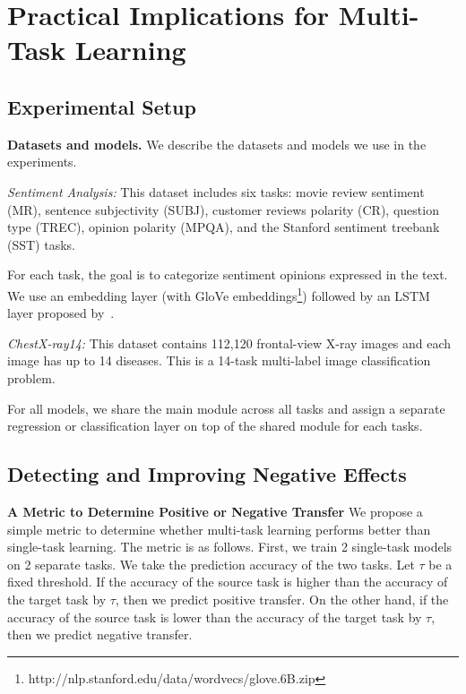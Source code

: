 \section{Practical Implications for Multi-Task Learning}

\subsection{Experimental Setup}

{\bf Datasets and models.} We describe the datasets and models we use in the experiments.

{\it Sentiment Analysis:} This dataset includes six tasks: movie review sentiment (MR), sentence subjectivity (SUBJ), customer reviews polarity (CR), question type (TREC), opinion polarity (MPQA), and the Stanford sentiment treebank (SST) tasks.

{For each task, the goal is to categorize sentiment opinions expressed in the text.
We use an embedding layer (with GloVe embeddings\footnote{http://nlp.stanford.edu/data/wordvecs/glove.6B.zip}) followed by an LSTM layer proposed by~\cite{lei2018simple}.
}

{\it ChestX-ray14:} This dataset contains 112,120 frontal-view X-ray images and each image has up to 14 diseases.
This is a 14-task multi-label image classification problem.

For all models, we share the main module across all tasks and assign a separate regression or classification layer on top of the shared module for each tasks.

\subsection{Detecting and Improving Negative Effects}

\textbf{A Metric to Determine Positive or Negative Transfer}
We propose a simple metric to determine whether multi-task learning performs better than single-task learning.
The metric is as follows.
First, we train 2 single-task models on 2 separate tasks.
We take the prediction accuracy of the two tasks.
Let $\tau$ be a fixed threshold.
If the accuracy of the source task is higher than the accuracy of the target task by $\tau$, then we predict positive transfer.
On the other hand, if the accuracy of the source task is lower than the accuracy of the target task by $\tau$, then we predict negative transfer.

